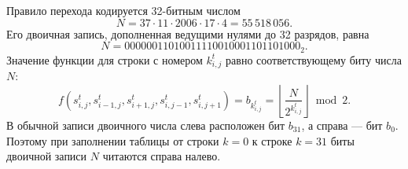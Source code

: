 Правило перехода кодируется 32-битным числом
\begin{equation}
    N = 37 \cdot 11 \cdot 2006 \cdot 17 \cdot 4 = 55\,518\,056.
\end{equation}
Его двоичная запись, дополненная ведущими нулями до 32 разрядов, равна
\begin{equation}
    N = 00000011010011110010001101101000_2.
\end{equation}
Значение функции для строки с номером $k^t_{i,j}$ равно соответствующему биту
числа $N$:
\begin{equation}
    f\left(
        s^t_{i,j},s^t_{i-1,j},s^t_{i+1,j},s^t_{i,j-1},s^t_{i,j+1}
    \right)
    = b_{k^t_{i,j}}
    = \left\lfloor \frac{N}{2^{k^t_{i,j}}} \right\rfloor \bmod 2.
    \label{eq:transition-rule}
\end{equation}
В обычной записи двоичного числа слева расположен бит $b_{31}$, а справа ---
бит $b_0$. Поэтому при заполнении таблицы от строки $k=0$ к строке $k=31$
биты двоичной записи $N$ читаются справа налево.

